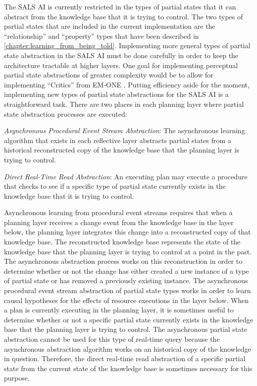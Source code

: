 The SALS AI is currently restricted in the types of partial states
that it can abstract from the knowledge base that it is trying to
control.  The two types of partial states that are included in the
current implementation are the ``relationship'' and ``property'' types
that have been described in
{\mbox{\autoref{chapter:learning_from_being_told}}}.
Implementing more general types of partial state abstraction in the
SALS AI must be done carefully in order to keep the architecture
tractable at higher layers.  One goal for implementing perceptual
partial state abstractions of greater complexity would be to allow for
implementing ``Critics'' from EM-ONE \cite[]{singh:2005b}.  Putting
efficiency aside for the moment, implementing new types of partial
state abstractions for the SALS AI is a straightforward task.  There
are two places in each planning layer where partial state abstraction
processes are executed:
\begin{packed_enumerate}
\item{\emph{Asynchronous Procedural Event Stream Abstraction}: The
  asynchronous learning algorithm that exists in each reflective layer
  abstracts partial states from a historical reconstructed copy of the
  knowledge base that the planning layer is trying to control.}
\item{\emph{Direct Real-Time Read Abstraction}: An executing plan may
  execute a procedure that checks to see if a specific type of partial
  state currently exists in the knowledge base that it is trying to
  control.}
\end{packed_enumerate}
Asynchronous learning from procedural event streams requires that when
a planning layer receives a change event from the knowledge base in
the layer below, the planning layer integrates this change into a
reconstructed copy of that knowledge base.  The reconstructed
knowledge base represents the state of the knowledge base that the
planning layer is trying to control at a point in the past.  The
asynchronous abstraction process works on this reconstruction in order
to determine whether or not the change has either created a new
instance of a type of partial state or has removed a previously
existing instance.  The asynchronous procedural event stream
abstraction of partial state types works in order to learn causal
hypotheses for the effects of resource executions in the layer below.
When a plan is currently executing in the planning layer, it is
sometimes useful to determine whether or not a specific partial state
currently exists in the knowledge base that the planning layer is
trying to control.  The asynchronous partial state abstraction cannot
be used for this type of real-time query because the asynchronous
abstraction algorithm works on an historical copy of the knowledge in
question.  Therefore, the direct real-time read abstraction of a
specific partial state from the current state of the knowledge base is
sometimes necessary for this purpose.

